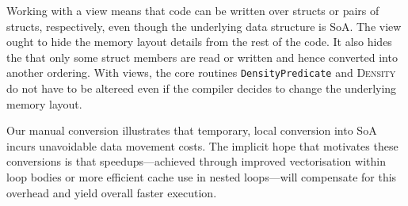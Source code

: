 \noindent
Working with a view means that code can be written over structs or pairs of structs, respectively, even though the underlying data structure is SoA.
The view ought to hide the memory layout details from the rest of the code.
It also hides the that only some struct members are read or written and hence converted into another ordering.
With views, the core routines \texttt{DensityPredicate} and \textsc{Density} do not have to be altereed even if the compiler decides to change the underlying memory layout.


Our manual conversion illustrates that temporary, local conversion into SoA incurs unavoidable data movement costs. 
The implicit hope that motivates these conversions is that speedups---achieved through improved vectorisation within loop bodies or more efficient cache use in nested loops---will compensate for this overhead and yield overall faster execution.

